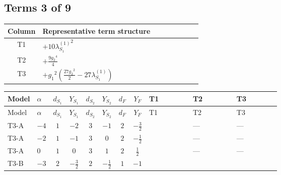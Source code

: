 \documentclass[8pt]{article}
\begin{document}
\begin{landscape}
\subsection*{Terms 3 of 9}
\begin{center}
\begin{tabular}{@{}c >{\raggedright\arraybackslash}p{0.82\linewidth}@{}}
\toprule
Column & Representative term structure \\
\midrule
T1 & \(\displaystyle +10 {\lambda_{S_1}^{(1)}}^2\) \\
\midrule
T2 & \(\displaystyle +\frac{9 {g_2}^4}{4}\) \\
\midrule
T3 & \(\displaystyle +{g_1}^2 \left(\frac{27 {g_2}^2}{2}-27 {\lambda_{S_1}^{(1)}}\right)\) \\
\midrule
\bottomrule
\end{tabular}
\end{center}
\smallskip
\tiny
\begin{longtable}{@{}llcccccc >{\raggedright\arraybackslash}p{0.21\linewidth} >{\raggedright\arraybackslash}p{0.21\linewidth} >{\raggedright\arraybackslash}p{0.21\linewidth}@{}}
\toprule
Model & $\alpha$ & $d_{S_1}$ & $Y_{S_1}$ & $d_{S_2}$ & $Y_{S_2}$ & $d_F$ & $Y_F$ & T1 & T2 & T3 \\
\midrule
\endfirsthead
\toprule
Model & $\alpha$ & $d_{S_1}$ & $Y_{S_1}$ & $d_{S_2}$ & $Y_{S_2}$ & $d_F$ & $Y_F$ & T1 & T2 & T3 \\
\midrule
\endhead
T3-A & $-4$ & $1$ & $-2$ & $3$ & $-1$ & $2$ & $-\frac{3}{2}$ & \scriptsize\adjustbox{max width=\linewidth}{$\begin{gathered} +10 {\lambda_{S_1}^{(1)}}^2\end{gathered}$} & --- & --- \\
\midrule
T3-A & $-2$ & $1$ & $-1$ & $3$ & $0$ & $2$ & $-\frac{1}{2}$ & \scriptsize\adjustbox{max width=\linewidth}{$\begin{gathered} +10 {\lambda_{S_1}^{(1)}}^2\end{gathered}$} & --- & --- \\
\midrule
T3-A & $0$ & $1$ & $0$ & $3$ & $1$ & $2$ & $\frac{1}{2}$ & \scriptsize\adjustbox{max width=\linewidth}{$\begin{gathered} +10 {\lambda_{S_1}^{(1)}}^2\end{gathered}$} & --- & --- \\
\midrule
T3-B & $-3$ & $2$ & $-\frac{3}{2}$ & $2$ & $-\frac{1}{2}$ & $1$ & $-1$ & \scriptsize\adjustbox{max width=\linewidth}{$\begin{gathered} +12 {\lambda_{S_1}^{(1)}}^2\end{gathered}$} & \scriptsize\adjustbox{max width=\linewidth}{$\begin{gathered} +\frac{9 {g_2}^4}{4}\end{gathered}$} & \scriptsize\adjustbox{max width=\linewidth}{$\begin{gathered} +{g_1}^2 \left(\frac{27 {g_2}^2}{2}-27 {\lambda_{S_1}^{(1)}}\right)\end{gathered}$} \\

\end{longtable}
\end{landscape}
\end{document}
